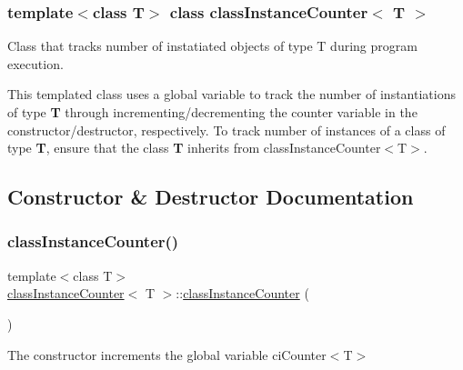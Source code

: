 \subsubsection*{template$<$class T$>$\newline
class class\+Instance\+Counter$<$ T $>$}

Class that tracks number of instatiated objects of type T during program execution. 

This templated class uses a global variable to track the number of instantiations of type {\bfseries T} through incrementing/decrementing the counter variable in the constructor/destructor, respectively. To track number of instances of a class of type {\bfseries T}, ensure that the class {\bfseries T} inherits from class\+Instance\+Counter$<$\+T$>$. 

\subsection{Constructor \& Destructor Documentation}
\mbox{\label{classclass_instance_counter_a9d5f75752ecb644bd7e732a3b9d43702}} 
\subsubsection{\texorpdfstring{class\+Instance\+Counter()}{classInstanceCounter()}}
{\footnotesize\ttfamily template$<$class T$>$ \\
\mbox{\hyperlink{classclass_instance_counter}{class\+Instance\+Counter}}$<$ T $>$\+::\mbox{\hyperlink{classclass_instance_counter}{class\+Instance\+Counter}} (\begin{DoxyParamCaption}{ }\end{DoxyParamCaption})\hspace{0.3cm}{\ttfamily [inline]}}



The constructor increments the global variable ci\+Counter$<$\+T$>$ 

\mbox{\label{classclass_instance_counter_aa4bb00c47ae2c87fa51e447624361a0a}} 
